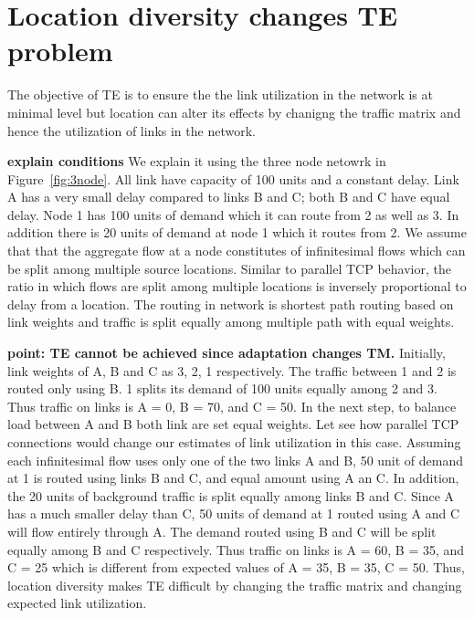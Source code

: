 
\section{Location diversity changes TE problem}


The objective of TE is to ensure the the link utilization in the network is at minimal level but location can alter its effects by chanigng the traffic matrix and hence the utilization of links in the network.

\textbf{explain conditions}
We explain it using the three node netowrk in Figure~\ref{fig:3node}.
All link have capacity of 100 units and a constant delay.  Link A has a very small delay compared to links B and C; both B and C have equal delay. Node 1 has 100 units of demand which it can route from 2 as well as 3. In addition there is 20 units of demand at node 1 which it routes from 2. We assume that that the aggregate flow at a node constitutes of infinitesimal flows which can be split among multiple source locations. Similar to parallel TCP behavior, the ratio in which flows are split among multiple locations is inversely proportional to delay from a location. The routing in network is shortest path routing based on link weights and traffic is split equally among multiple path with equal weights.

\textbf{point: TE cannot be achieved since adaptation changes TM.}
Initially, link weights of A, B and C as 3, 2, 1 respectively. The traffic between 1 and 2 is routed only using B. 1 splits its demand of 100 units equally among 2 and 3. Thus traffic on links is A = 0, B = 70, and C = 50. In the next step, to balance load between A and B both link are set equal weights.  Let see how parallel TCP connections would change our estimates of link utilization in this case. Assuming each infinitesimal flow uses only one of the two links A and B, 50 unit of demand at 1 is routed using links B and C, and equal amount using A an C. In addition, the 20 units of background traffic is split equally among links B and C.  Since A has a much smaller delay than C, 50 units of demand at 1 routed using A and C will flow entirely through A. The demand routed using B and C will be split equally among B and C respectively. Thus traffic on links is A = 60, B = 35, and C = 25 which is different from expected values of A = 35, B = 35, C = 50. Thus, location diversity makes TE difficult by changing the traffic matrix and changing expected link utilization.
